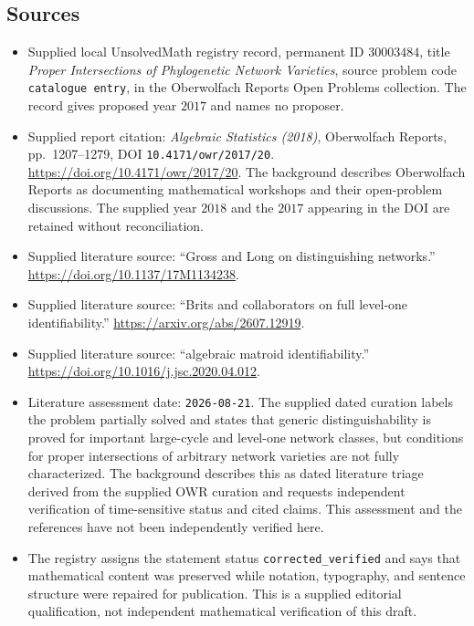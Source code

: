 \documentclass[11pt]{article}
\begin{document}
\subsection{Sources}
\begin{itemize}
\item Supplied local UnsolvedMath registry record, permanent ID \(30003484\), title \emph{Proper Intersections of Phylogenetic Network Varieties}, source problem code \texttt{catalogue entry}, in the Oberwolfach Reports Open Problems collection. The record gives proposed year \(2017\) and names no proposer.
\item Supplied report citation: \emph{Algebraic Statistics (2018)}, Oberwolfach Reports, pp.\ 1207--1279, DOI \texttt{10.4171/owr/2017/20}. \url{https://doi.org/10.4171/owr/2017/20}. The background describes Oberwolfach Reports as documenting mathematical workshops and their open-problem discussions. The supplied year \(2018\) and the \(2017\) appearing in the DOI are retained without reconciliation.
\item Supplied literature source: ``Gross and Long on distinguishing networks.'' \url{https://doi.org/10.1137/17M1134238}.
\item Supplied literature source: ``Brits and collaborators on full level-one identifiability.'' \url{https://arxiv.org/abs/2607.12919}.
\item Supplied literature source: ``algebraic matroid identifiability.'' \url{https://doi.org/10.1016/j.jsc.2020.04.012}.
\item Literature assessment date: \texttt{2026-08-21}. The supplied dated curation labels the problem partially solved and states that generic distinguishability is proved for important large-cycle and level-one network classes, but conditions for proper intersections of arbitrary network varieties are not fully characterized. The background describes this as dated literature triage derived from the supplied OWR curation and requests independent verification of time-sensitive status and cited claims. This assessment and the references have not been independently verified here.
\item The registry assigns the statement status \texttt{corrected\_verified} and says that mathematical content was preserved while notation, typography, and sentence structure were repaired for publication. This is a supplied editorial qualification, not independent mathematical verification of this draft.
\end{itemize}
\end{document}
